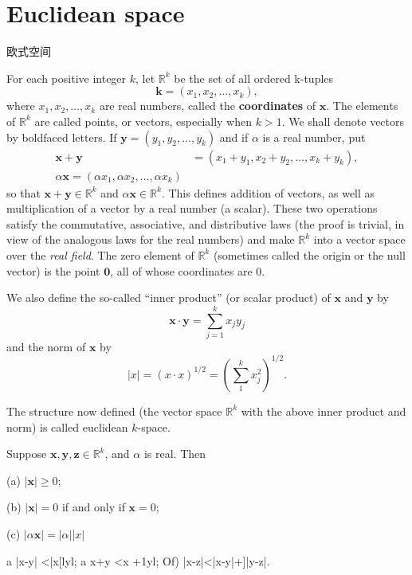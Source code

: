 \section{Euclidean space}
欧式空间

\begin{myDefinition}\label{myDefinition:coordinates}
    For each positive integer $k$, let $\mathbb{R}^k$ be the set of all ordered k-tuples
    \begin{equation*}
        \mathbf{k} = \left(x_1,x_2,\dots,x_k\right),
    \end{equation*}
    where $x_1,x_2,\dots,x_k$ are real numbers, called the \textbf{coordinates} of $\mathbf{x}$. The elements of
    $\mathbb{R}^k$ are called points, or vectors, especially when $k > 1$. We shall denote vectors
    by boldfaced letters. 
    If $\mathbf{y} = \left(y_1,y_2,\dots,y_k\right)$ and if $\alpha$ is a real number, put
    \begin{align*}
        \mathbf{x} + \mathbf{y} &= \left(x_1+y_1,x_2+y_2,\dots,x_k+y_k\right),\\
        \alpha\mathbf{x}  = \left(\alpha x_1,\alpha x_2,\dots,\alpha x_k\right)
    \end{align*}
    so that $\mathbf{x} +\mathbf{y} \in \mathbb{R}^k$ and $\alpha\mathbf{x} \in \mathbb{R}^k$. This defines addition of vectors, as well as multiplication of a vector by a real number (a scalar). These two operations satisfy the commutative, associative, and distributive laws (the proof is trivial, in view of the analogous laws for the real numbers) and make $\mathbb{R}^k$ into a vector space over the \emph{real field}. The zero element of $\mathbb{R}^k$ (sometimes called the origin or the null vector) is the point $\mathbf{0}$, all of whose coordinates are $0$.

    We also define the so-called ``inner product'' (or scalar product) of $\mathbf{x}$ and $\mathbf{y}$ by
    \begin{equation*}
        \mathbf{x}\cdot\mathbf{y} = \sum_{j=1}^{k}x_j y_j
    \end{equation*}
    and the norm of $\mathbf{x}$ by
    \begin{equation*}
        |x| = (x\cdot x)^{1/2} = \left( \sum_{1}^{k} x_j^2 \right)^{1/2}.
    \end{equation*}

    The structure now defined (the vector space $\mathbb{R}^k$ with the above inner product and norm) is called euclidean $k$-space.
\end{myDefinition}

\begin{thm}\label{thm:1.37vector}
    Suppose $\mathbf{x}, \mathbf{y}, \mathbf{z}\in\mathbb{R}^k$, and $\alpha$ is real. Then

(a) $| \mathbf{x}| \geq 0$;

(b) $| \mathbf{x}| = 0$ if and only if $\mathbf{x} =0$;

(c) $| \alpha \mathbf{x}| = | \alpha||x|$

a |x-y| <|x[lyl;
a x+y <x +1yl;
Of) |x-z|<|x-y|+]|y-z|.
\end{thm}


